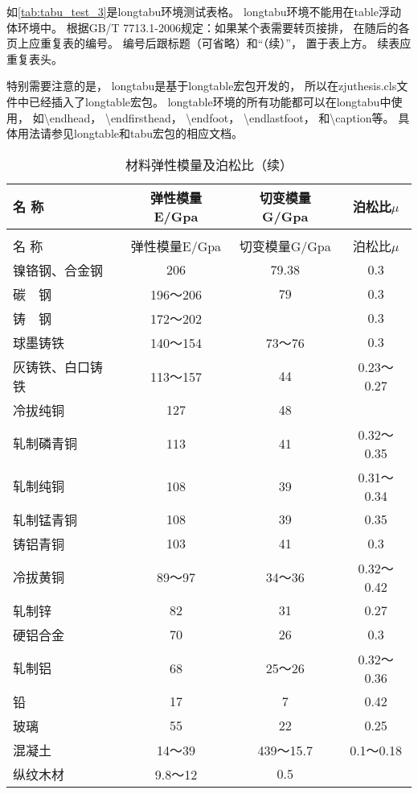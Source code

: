 如\autoref{tab:tabu_test_3}是longtabu环境测试表格。
longtabu环境不能用在table浮动体环境中。
根据GB/T 7713.1-2006规定：如果某个表需要转页接排，
在随后的各页上应重复表的编号。
编号后跟标题（可省略）和“（续）”， %
置于表上方。
续表应重复表头。

特别需要注意的是，
longtabu是基于longtable宏包开发的，
所以在zjuthesis.cls文件中已经插入了longtable宏包。
longtable环境的所有功能都可以在longtabu中使用，
如\textbackslash endhead，
\textbackslash endfirsthead，
\textbackslash endfoot，
\textbackslash endlastfoot，
和\textbackslash caption等。
具体用法请参见longtable和tabu宏包的相应文档。

\begin{longtabu}{lccc}
\caption{材料弹性模量及泊松比}\label{tab:tabu_test_3}\\
\toprule
名  称   & 弹性模量E/Gpa & 切变模量G/Gpa & 泊松比$\mu$ \\
\midrule%
\endfirsthead
\caption{材料弹性模量及泊松比（续）}\\
\toprule
名  称   & 弹性模量E/Gpa & 切变模量G/Gpa & 泊松比$\mu$ \\
\midrule%
\endhead
\bottomrule%
\endfoot
镍铬钢、合金钢 & 206    & 79.38  & 0.3 \\
碳　钢    &  196～206 & 79     & 0.3 \\
铸　钢    &  172～202 &        & 0.3 \\
球墨铸铁   &  140～154 &  73～76 & 0.3 \\
灰铸铁、白口铸铁 &  113～157 & 44     &  0.23～0.27 \\
冷拔纯铜   & 127    & 48     &   \\
轧制磷青铜  & 113    & 41     &  0.32～0.35 \\
轧制纯铜   & 108    & 39     &  0.31～0.34 \\
轧制锰青铜  & 108    & 39     & 0.35 \\
铸铝青铜   & 103    & 41     & 0.3 \\
冷拔黄铜   &  89～97 &  34～36 &  0.32～0.42 \\
轧制锌    & 82     & 31     & 0.27 \\
硬铝合金   & 70     & 26     & 0.3 \\
轧制铝    & 68     &  25～26 &  0.32～0.36 \\
铅      & 17     & 7      & 0.42 \\
玻璃     & 55     & 22     & 0.25 \\
混凝土    &  14～39 &  439～15.7 &  0.1～0.18 \\
纵纹木材   &  9.8～12 & 0.5    &   \\

\end{longtabu}
